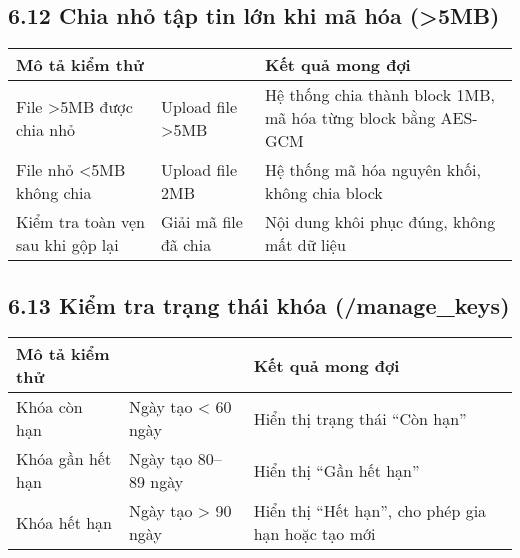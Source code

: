 \subsection*{6.12 Chia nhỏ tập tin lớn khi mã hóa (>5MB)}
\begin{table}[H]
\centering
\begin{tabular}{|>{\centering\arraybackslash}p{4.3cm}|>{\arraybackslash}p{5cm}|>{\centering\arraybackslash}p{7.5cm}|}
\hline
\textbf{Mô tả kiểm thử} &
\multicolumn{1}{>{\centering\arraybackslash}p{5cm}|}{\textbf{Input}} & 
\textbf{Kết quả mong đợi} \\ \hline
File >5MB được chia nhỏ & Upload file >5MB & Hệ thống chia thành block 1MB, mã hóa từng block bằng AES-GCM \\ \hline
File nhỏ <5MB không chia & Upload file 2MB & Hệ thống mã hóa nguyên khối, không chia block \\ \hline
Kiểm tra toàn vẹn sau khi gộp lại & Giải mã file đã chia & Nội dung khôi phục đúng, không mất dữ liệu \\ \hline
\end{tabular}
\end{table}

\subsection*{6.13 Kiểm tra trạng thái khóa (/manage\_keys)}
\begin{table}[H]
\centering
\begin{tabular}{|>{\centering\arraybackslash}p{4.3cm}|>{\arraybackslash}p{5cm}|>{\centering\arraybackslash}p{7.5cm}|}
\hline
\textbf{Mô tả kiểm thử} &
\multicolumn{1}{>{\centering\arraybackslash}p{5cm}|}{\textbf{Input}} & 
\textbf{Kết quả mong đợi} \\ \hline
Khóa còn hạn & Ngày tạo < 60 ngày & Hiển thị trạng thái “Còn hạn” \\ \hline
Khóa gần hết hạn & Ngày tạo 80–89 ngày & Hiển thị “Gần hết hạn” \\ \hline
Khóa hết hạn & Ngày tạo > 90 ngày & Hiển thị “Hết hạn”, cho phép gia hạn hoặc tạo mới \\ \hline
\end{tabular}
\end{table}

